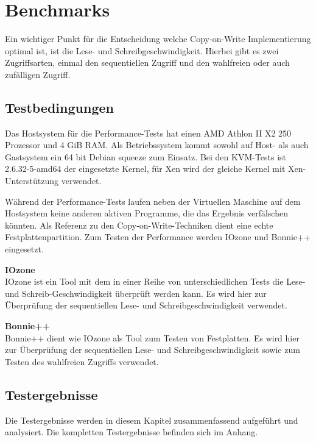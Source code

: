 \section{Benchmarks}
Ein wichtiger Punkt für die Entscheidung welche Copy-on-Write Implementierung optimal ist, ist die Lese- und Schreibgeschwindigkeit. Hierbei gibt es zwei Zugriffsarten, einmal den sequentiellen Zugriff und den wahlfreien oder auch zufälligen Zugriff. 

\subsection{Testbedingungen}
Das Hostsystem für die Performance-Tests hat einen AMD Athlon II X2 250 Prozessor und 4 GiB RAM. Als Betriebssystem kommt sowohl auf Host- als auch Gastsystem ein 64 bit Debian squeeze zum Einsatz. Bei den KVM-Tests ist 2.6.32-5-amd64 der eingesetzte Kernel, für Xen wird der gleiche Kernel mit Xen-Unterstützung verwendet.

Während der Performance-Tests laufen neben der Virtuellen Maschine auf dem Hostsystem keine anderen aktiven Programme, die das Ergebnis verfälschen könnten. Als Referenz zu den Copy-on-Write-Techniken dient eine echte Festplattenpartition. Zum Testen der Performance werden IOzone und Bonnie++ eingesetzt.

\textbf{IOzone} \\
IOzone ist ein Tool mit dem in einer Reihe von unterschiedlichen Tests die Lese- und Schreib-Geschwindigkeit überprüft werden kann. Es wird hier zur Überprüfung der sequentiellen Lese- und Schreibgeschwindigkeit verwendet.

\textbf{Bonnie++} \\
Bonnie++ dient wie IOzone als Tool zum Testen von Festplatten. Es wird hier zur Überprüfung der sequentiellen Lese- und Schreibgeschwindigkeit sowie zum Testen des wahlfreien Zugriffs verwendet.

\subsection{Testergebnisse}
Die Testergebnisse werden in diesem Kapitel zusammenfassend aufgeführt und analysiert. Die kompletten Testergebnisse befinden sich im Anhang.

\begin{comment} Bei dem Iozone-Test wurden Dateigrößen von 512 MB, 2 GB, 4 Gb und 8 GB verwendet. Für die Entscheidungsfindung wird jedoch nur der Test mit 8 GB Dateigröße herangezogen. \end{comment}

